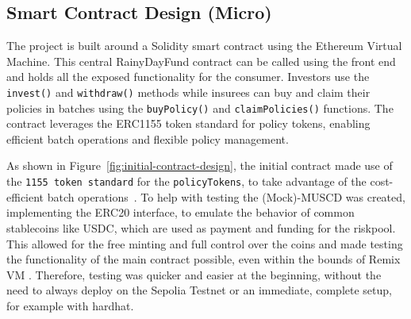 \documentclass[11pt,a4paper]{article}
\begin{document}
	\subsection{Smart Contract Design (Micro)}\label{subsec:smart-contract-design}
	The project is built around a Solidity smart contract using the Ethereum Virtual Machine.
	This central RainyDayFund contract can be called using the front end and holds all the exposed functionality for the consumer.
	Investors use the \texttt{invest()} and \texttt{withdraw()} methods while insurees can buy and claim their policies in batches using the \texttt{buyPolicy()} and \texttt{claimPolicies()} functions.
	The contract leverages the ERC1155 token standard for policy tokens, enabling efficient batch operations and flexible policy management.

	As shown in Figure~\ref{fig:initial-contract-design}, the initial contract made use of the \texttt{1155 token standard} for the \texttt{policyTokens}, to take advantage of the cost-efficient batch operations~\parencite{ERC1155}.
	To help with testing the (Mock)-MUSCD was created, implementing the ERC20 interface, to emulate the behavior of common stablecoins like USDC, which are used as payment and funding for the riskpool.
	This allowed for the free minting and full control over the coins and made testing the functionality of the main contract possible, even within the bounds of Remix VM .
	Therefore, testing was quicker and easier at the beginning, without the need to always deploy on the Sepolia Testnet or an immediate, complete setup, for example with hardhat.
\end{document}
